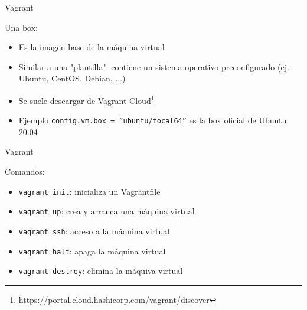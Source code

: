 \documentclass{beamer}
\begin{document}
\begin{frame}{Vagrant} 

Una box:

\begin{itemize}
    \item Es la imagen base de la máquina virtual
    \item Similar a una "plantilla": contiene un sistema operativo preconfigurado (ej. Ubuntu, CentOS, Debian, ...)
    \item Se suele descargar de Vagrant Cloud\footnote{\url{https://portal.cloud.hashicorp.com/vagrant/discover}}
    \item Ejemplo \texttt{config.vm.box = ''ubuntu/focal64''} es la box oficial de Ubuntu 20.04
\end{itemize}

\end{frame}

\begin{frame}{Vagrant}

Comandos:

\begin{itemize}
    \item \texttt{vagrant init}: inicializa un Vagrantfile
    \item \texttt{vagrant up}: crea y arranca una máquina virtual
    \item \texttt{vagrant ssh}: acceso a la máquina virtual
    \item \texttt{vagrant halt}: apaga la máquina virtual
    \item \texttt{vagrant destroy}: elimina la máquiva virtual

\end{itemize}
    
\end{frame}
\end{document}

